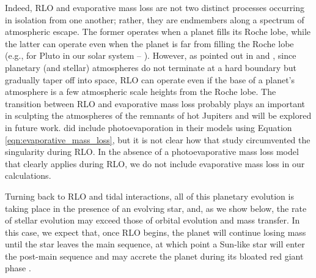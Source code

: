 \documentclass{svjour3}                     %
\begin{document}
Indeed, RLO and evaporative mass loss are not two distinct processes occurring in isolation from one another; rather, they are endmembers along a spectrum of atmospheric escape. The former operates when a planet fills its Roche lobe, while the latter can operate even when the planet is far from filling the Roche lobe (e.g., for Pluto in our solar system -- \cite{Watson1981Dynamics}). However, as pointed out in \cite{Ritter1988Turning} and \cite{Li2010WASP12b}, since planetary (and stellar) atmospheres do not terminate at a hard boundary but gradually taper off into space, RLO can operate even if the base of a planet's atmosphere is a few atmospheric scale heights from the Roche lobe. The transition between RLO and evaporative mass loss probably plays an important in sculpting the atmospheres of the remnants of hot Jupiters and will be explored in future work. \cite{2015ApJ...813..101V} did include photoevaporation in their models using Equation \ref{eqn:evaporative_mass_loss}, but it is not clear how that study circumvented the singularity during RLO. In the absence of a photoevaporative mass loss model that clearly applies during RLO, we do not include evaporative mass loss in our calculations.

Turning back to RLO and tidal interactions, all of this planetary evolution is taking place in the presence of an evolving star, and, as we show below, the rate of stellar evolution may exceed those of orbital evolution and mass transfer. In this case, we expect that, once RLO begins, the planet will continue losing mass until the star leaves the main sequence, at which point a Sun-like star will enter the post-main sequence and may accrete the planet during its bloated red giant phase \cite{2009ApJ...700..832C}.
\end{document}
